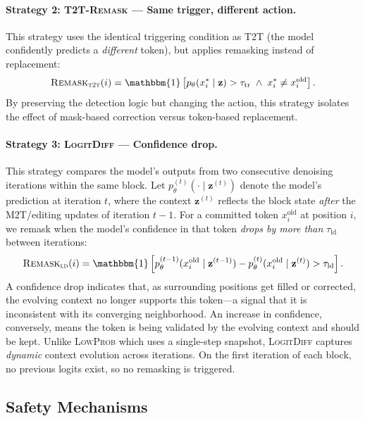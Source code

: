 \documentclass{article}
\newcommand{\MtoT}{\textrm{M2T}}
\newcommand{\TtoT}{\textrm{T2T}}
\newcommand{\xold}{x_i^{\mathrm{old}}}
\newcommand{\xnew}{x_i^{*}}
\begin{document}
\paragraph{Strategy 2: \textsc{T2T-Remask} --- Same trigger, different action.}
This strategy uses the identical triggering condition as \TtoT{} (the model confidently predicts a \emph{different} token), but applies remasking instead of replacement:
\begin{equation}
    \textsc{Remask}_{\textsc{t2t}}(i) = \mathbbm{1}\left[p_\theta(\xnew \mid \mathbf{z}) > \tau_{\text{tr}} \;\land\; \xnew \neq \xold\right].
    \label{eq:t2t_remask}
\end{equation}
By preserving the detection logic but changing the action, this strategy isolates the effect of mask-based correction versus token-based replacement.

\paragraph{Strategy 3: \textsc{LogitDiff} --- Confidence drop.}
This strategy compares the model's outputs from two consecutive denoising iterations within the same block. Let $p_\theta^{(t)}(\cdot \mid \mathbf{z}^{(t)})$ denote the model's prediction at iteration $t$, where the context $\mathbf{z}^{(t)}$ reflects the block state \emph{after} the \MtoT{}/editing updates of iteration $t{-}1$. For a committed token $\xold$ at position $i$, we remask when the model's confidence in that token \emph{drops by more than} $\tau_{\text{ld}}$ between iterations:
\begin{equation}
    \textsc{Remask}_{\textsc{ld}}(i) = \mathbbm{1}\left[p_\theta^{(t-1)}(\xold \mid \mathbf{z}^{(t-1)}) - p_\theta^{(t)}(\xold \mid \mathbf{z}^{(t)}) > \tau_{\text{ld}}\right].
    \label{eq:logit_diff}
\end{equation}
A confidence drop indicates that, as surrounding positions get filled or corrected, the evolving context no longer supports this token---a signal that it is inconsistent with its converging neighborhood. An increase in confidence, conversely, means the token is being validated by the evolving context and should be kept. Unlike \textsc{LowProb} which uses a single-step snapshot, \textsc{LogitDiff} captures \emph{dynamic} context evolution across iterations. On the first iteration of each block, no previous logits exist, so no remasking is triggered.

\subsection{Safety Mechanisms}
\end{document}
